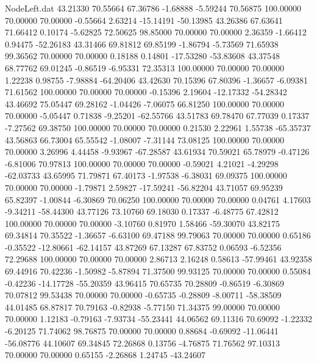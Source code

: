 \begin{filecontents}{NodeLeft.dat}
  43.21330   70.55664   67.36786    -1.68888   -5.59244   70.56875  100.00000   70.00000   70.00000   -0.55664    2.63214  -15.14191  -50.13985
  43.26386   67.63641   71.66412     0.10174   -5.62825   72.50625   98.85000   70.00000   70.00000    2.36359   -1.66412    0.94475  -52.26183
  43.31466   69.81812   69.85199    -1.86794   -5.73569   71.65938   99.36562   70.00000   70.00000    0.18188    0.14801  -17.53280  -53.83608
  43.37548   68.77762   69.01245    -0.86519   -6.95331   72.35313  100.00000   70.00000   70.00000    1.22238    0.98755   -7.98884  -64.20406
  43.42630   70.15396   67.80396    -1.36657   -6.09381   71.61562  100.00000   70.00000   70.00000   -0.15396    2.19604  -12.17332  -54.28342
  43.46692   75.05447   69.28162    -1.04426   -7.06075   66.81250  100.00000   70.00000   70.00000   -5.05447    0.71838   -9.25201  -62.55766
  43.51783   69.78470   67.77039     0.17337   -7.27562   69.38750  100.00000   70.00000   70.00000    0.21530    2.22961    1.55738  -65.35737
  43.56863   66.73004   65.55542    -1.08007   -7.31144   73.08125  100.00000   70.00000   70.00000    3.26996    4.44458   -9.93967  -67.28587
  43.61934   70.59021   65.78979    -0.47126   -6.81006   70.97813  100.00000   70.00000   70.00000   -0.59021    4.21021   -4.29298  -62.03733
  43.65995   71.79871   67.40173    -1.97538   -6.38031   69.09375  100.00000   70.00000   70.00000   -1.79871    2.59827  -17.59241  -56.82204
  43.71057   69.95239   65.82397    -1.00844   -6.30869   70.06250  100.00000   70.00000   70.00000    0.04761    4.17603   -9.34211  -58.44300
  43.77126   73.10760   69.18030     0.17337   -6.48775   67.42812  100.00000   70.00000   70.00000   -3.10760    0.81970    1.58466  -59.30070
  43.82175   69.34814   70.35522    -1.36657   -6.63100   69.47188   99.79063   70.00000   70.00000    0.65186   -0.35522  -12.80661  -62.14157
  43.87269   67.13287   67.83752     0.06593   -6.52356   72.29688  100.00000   70.00000   70.00000    2.86713    2.16248    0.58613  -57.99461
  43.92358   69.44916   70.42236    -1.50982   -5.87894   71.37500   99.93125   70.00000   70.00000    0.55084   -0.42236  -14.17728  -55.20359
  43.96415   70.65735   70.28809    -0.86519   -6.30869   70.07812   99.53438   70.00000   70.00000   -0.65735   -0.28809   -8.00711  -58.38509
  44.01485   68.87817   70.79163    -0.82938   -5.77150   71.34375   99.00000   70.00000   70.00000    1.12183   -0.79163   -7.93734  -55.23441
  44.06562   69.11316   70.69092    -1.22332   -6.20125   71.74062   98.76875   70.00000   70.00000    0.88684   -0.69092  -11.06441  -56.08776
  44.10607   69.34845   72.26868     0.13756   -4.76875   71.76562   97.10313   70.00000   70.00000    0.65155   -2.26868    1.24745  -43.24607

\end{filecontents}
